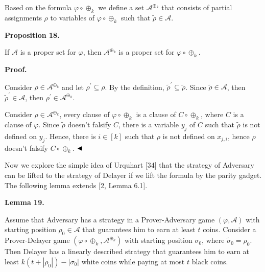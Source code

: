 Based on the formula $\varphi\circ\oplus_{k}$ we define a set $\mathcal{A}^{\oplus_{k}}$ that
consists of partial assignments $\rho$ to variables of $\varphi\circ\oplus_{k}$ such that
$\tilde{\rho}\in\mathcal{A}$.\par



\par\medskip\noindent\textbf{
Proposition 18.
}\par



If $\mathcal{A}$ is a proper set for $\varphi$, then $\mathcal{A}^{\oplus_{k}}$ is a
proper set for $\varphi\circ\oplus_{k}$.\par



\par\medskip\noindent\textbf{Proof.}\par


Consider $\rho\in\mathcal{A}^{\oplus_{k}}$ and let $\rho^{\prime}\subseteq\rho$.
By the definition, $\tilde{\rho}^{\prime}\subseteq\tilde{\rho}$.
Since $\tilde{\rho}\in\mathcal{A}$,
then $\tilde{\rho}^{\prime}\in\mathcal{A}$, then $\rho^{\prime}\in\mathcal{A}^{\oplus_{k}}$.\par



Consider $\rho\in\mathcal{A}^{\oplus_{k}}$, every clause of $\varphi\circ\oplus_{k}$ is a
clause of $C\circ\oplus_{k}$, where $C$ is a clause of $\varphi$.
Since $\tilde{\rho}$ doesn’t falsify $C$,
there is a variable $y_{j}$ of $C$ such that $\tilde{\rho}$ is not defined on $y_{j}$.
Hence, there is $i\in[k]$ such that $\rho$ is not defined on $x_{j,i}$, hence $\rho$ doesn’t falsify $C\circ\oplus_{k}$.
$\hfill\blacktriangleleft$\par



Now we explore the simple idea of Urquhart [34] that the strategy of
Adversary can be lifted to the strategy of Delayer if we lift the formula by the parity gadget.
The following lemma extends [2, Lemma 6.1].\par



\par\medskip\noindent\textbf{
Lemma 19.
}\par



Assume that Adversary has a strategy in a Prover-Adversary game
$(\varphi,\mathcal{A})$ with starting position $\rho_{0}\in\mathcal{A}$
that guarantees him to earn at least $t$ coins.
Consider a Prover-Delayer game $(\varphi\circ\oplus_{k},\mathcal{A}^{\oplus_{k}})$
with starting position $\sigma_{0}$, where $\tilde{\sigma}_{0}=\rho_{0}$.
Then Delayer has a linearly described strategy that guarantees him to earn at
least $k(t+|\rho_{0}|)-|\sigma_{0}|$ white coins while paying at most $t$ black coins.\par



